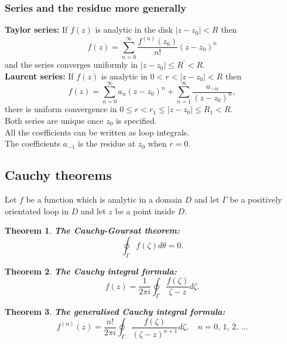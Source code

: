 \documentclass{article}
\newtheorem{theorem}{Theorem}
\begin{document}
\subsubsection{Series and the residue more generally}
\textbf{Taylor series:} If $f(z)$ is analytic in the disk $\vert z-z_0\vert<R$ then
\begin{equation}
    f(z)=\sum_{n=0}^\infty \frac{f^{(n)}(z_0)}{n!}(z-z_0)^n
\end{equation}
and the series converges uniformly in $\vert z-z_0\vert\leq R^\prime<R$.\\
\textbf{Laurent series:} If $f(z)$ is analytic in $0<r<\vert z-z_0\vert<R$ then
\begin{equation}
    f(z)=\sum_{n=0}^\infty a_n(z-z_0)^n + \sum_{n=1}^\infty\frac{a_{-n}}{(z-z_0)^n},
\end{equation}
there is uniform convergence in $0\leq r<r_1\leq\vert z-z_0\vert\leq R_1<R$. \\
Both series are unique once $z_0$ is specified. \\
All the coefficients can be written as loop integrals.\\
The coefficients $a_{-1}$ is the residue at $z_0$ when $r=0$. 

\subsection{Cauchy theorems}
Let $f$ be a function which is analytic in a domain $D$ and let $\Gamma$ be a positively orientated loop in $D$ and let $z$ be a point inside $D$.
\begin{theorem}
    \textbf{The Cauchy-Goursat theorem:}
    \begin{equation}
        \oint_\Gamma f(\zeta)d\theta = 0.
    \end{equation}
\end{theorem}
\begin{theorem}
    \textbf{The Cauchy integral formula:}
    \begin{equation}
        f(z) = \frac{1}{2\pi i}\oint_\Gamma \frac{f(\zeta)}{\zeta-z}d\zeta.
    \end{equation}
\end{theorem}
\begin{theorem}
    \textbf{The generalised Cauchy integral formula:}
    \begin{equation}
        f^{(n)}(z) = \frac{n!}{2\pi i}\oint_\Gamma \frac{f(\zeta)}{(\zeta-z)^{n+1}}d\zeta,\quad n=0,\,1,\,2,\,\ldots 
    \end{equation}
\end{theorem}
\end{document}

